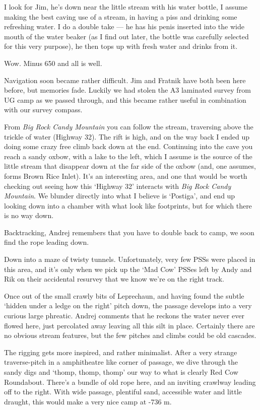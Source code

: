 I look for Jim, he's down near the little stream with his water bottle,
I assume making the best caving use of a stream, in having a piss and
drinking some refreshing water. I do a double take --- he has his penis
inserted into the wide mouth of the water beaker (as I find out later,
the bottle was carefully selected for this very purpose), he then tops
up with fresh water and drinks from it.

Wow. Minus 650 and all is well.

Navigation soon became rather difficult. Jim and Fratnik have both been
here before, but memories fade. Luckily we had stolen the A3 laminated
survey from UG camp as we passed through, and this became rather useful
in combination with our survey compass.

From \emph{Big Rock Candy Mountain} you can follow the stream,
traversing above the trickle of water (Highway 32). The rift is high,
and on the way back I ended up doing some crazy free climb back down at
the end. Continuing into the cave you reach a sandy oxbow, with a lake
to the left, which I assume is the source of the little stream that
disappear down at the far side of the oxbow (and, one assumes, forms
Brown Rice Inlet). It's an interesting area, and one that would be worth
checking out seeing how this `Highway 32' interacts with \emph{Big Rock
Candy Mountain}. We blunder directly into what I believe is `Postiga',
and end up looking down into a chamber with what look like footprints,
but for which there is no way down.

Backtracking, Andrej remembers that you have to double back to camp, we
soon find the rope leading down.

Down into a maze of twisty tunnels. Unfortunately, very few PSSs were
placed in this area, and it's only when we pick up the `Mad Cow' PSSes
left by Andy and Rik on their accidental resurvey that we know we're on
the right track.

Once out of the small crawly bits of Leprechaun, and having found the
subtle `hidden under a ledge on the right' pitch down, the passage
develops into a very curious large phreatic. Andrej comments that he
reckons the water never ever flowed here, just percolated away leaving
all this silt in place. Certainly there are no obvious stream features,
but the few pitches and climbs could be old cascades.

The rigging gets more inspired, and rather minimalist. After a very
strange traverse-pitch in a amphitheatre like corner of passage, we dive
through the sandy digs and `thomp, thomp, thomp' our way to what is
clearly Red Cow Roundabout. There's a bundle of old rope here, and an
inviting crawlway leading off to the right. With wide passage, plentiful
sand, accessible water and little draught, this would make a very nice
camp at -736 m.

